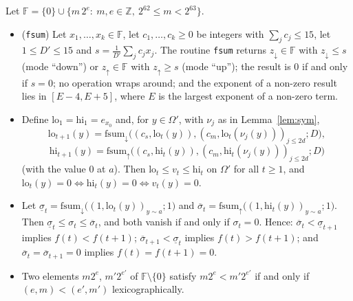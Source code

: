 \begin{lemma}\label{lem:float}
Let $\mathbb F=\{0\}\cup\{m\,2^e:\ m,e\in\mathbb Z,\ 2^{62}\le m<2^{63}\}$.
\begin{itemize}
\item[(a)] (\texttt{fsum}) Let $x_1,\dots,x_k\in\mathbb F$, let $c_1,\dots,c_k\ge0$ be integers with $\sum_jc_j\le15$, let $1\le D'\le15$ and $s=\frac1{D'}\sum_jc_jx_j$. The routine \texttt{fsum} returns $z_\downarrow\in\mathbb F$ with $z_\downarrow\le s$ (mode ``down'') or $z_\uparrow\in\mathbb F$ with $z_\uparrow\ge s$ (mode ``up''); the result is $0$ if and only if $s=0$; no operation wraps around; and the exponent of a non-zero result lies in $[E-4,E+5]$, where $E$ is the largest exponent of a non-zero term.
\item[(b)] Define $\mathrm{lo}_1=\mathrm{hi}_1=e_{x_0}$ and, for $y\in\Omega'$, with $\nu_j$ as in Lemma~\ref{lem:sym},
\[
\mathrm{lo}_{t+1}(y)=\mathrm{fsum}_\downarrow\bigl((c_s,\mathrm{lo}_t(y)),(c_m,\mathrm{lo}_t(\nu_j(y)))_{j\le2d};D\bigr),
\]
\[
\mathrm{hi}_{t+1}(y)=\mathrm{fsum}_\uparrow\bigl((c_s,\mathrm{hi}_t(y)),(c_m,\mathrm{hi}_t(\nu_j(y)))_{j\le2d};D\bigr)
\]
(with the value $0$ at $a$). Then $\mathrm{lo}_t\le v_t\le\mathrm{hi}_t$ on $\Omega'$ for all $t\ge1$, and $\mathrm{lo}_t(y)=0\iff\mathrm{hi}_t(y)=0\iff v_t(y)=0$.
\item[(c)] Let $\underline\sigma_t=\mathrm{fsum}_\downarrow\bigl((1,\mathrm{lo}_t(y))_{y\sim a};1\bigr)$ and $\overline\sigma_t=\mathrm{fsum}_\uparrow\bigl((1,\mathrm{hi}_t(y))_{y\sim a};1\bigr)$. Then $\underline\sigma_t\le\sigma_t\le\overline\sigma_t$, and both vanish if and only if $\sigma_t=0$. Hence: $\overline\sigma_t<\underline\sigma_{t+1}$ implies $f(t)<f(t+1)$; $\overline\sigma_{t+1}<\underline\sigma_t$ implies $f(t)>f(t+1)$; and $\overline\sigma_t=\overline\sigma_{t+1}=0$ implies $f(t)=f(t+1)=0$.
\item[(d)] Two elements $m2^e$, $m'2^{e'}$ of $\mathbb F\setminus\{0\}$ satisfy $m2^e<m'2^{e'}$ if and only if $(e,m)<(e',m')$ lexicographically.
\end{itemize}
\end{lemma}
